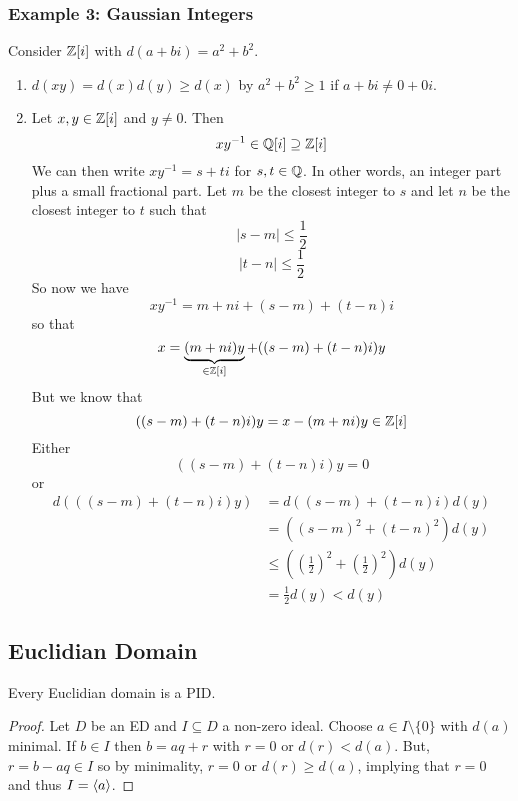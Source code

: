 \documentclass[letterpaper]{article}
\begin{document}
\subsubsection{Example 3: Gaussian Integers}
Consider $\mathbb{Z}[i]$ with $d(a + bi) = a^2 + b^2$. 
\begin{enumerate}
    \item $d(xy) = d(x)d(y) \geq d(x)$ by $a^2 + b^2 \geq 1$ if $a + bi \neq 0 + 0i$. 
    \item Let $x, y \in \mathbb{Z}[i]$ and $y \neq 0$. Then 
    \[xy^{-1} \in \mathbb{Q}[i] \supseteq \mathbb{Z}[i]\]
    We can then write $xy^{-1} = s + ti$ for $s, t \in \mathbb{Q}$. In other words, an integer part plus a small fractional part. Let $m$ be the closest integer to $s$ and let $n$ be the closest integer to $t$ such that 
    \[|s - m| \leq \frac{1}{2}\]
    \[|t - n| \leq \frac{1}{2}\]
    So now we have 
    \[xy^{-1} = m + ni + (s - m) + (t - n)i\]
    so that 
    \[x = \underbrace{(m + ni)y}_{\in \mathbb{Z}[i]} + ((s - m) + (t - n)i)y\]
    But we know that 
    \[((s - m) + (t - n)i)y = x - (m + ni)y \in \mathbb{Z}[i]\]
    Either 
    \[((s - m) + (t - n)i)y = 0\]
    or 
    \begin{equation*}
        \begin{aligned}
            d(((s - m) + (t - n)i)y) &= d((s - m) + (t - n)i) d(y) \\ 
                &= ((s - m)^2 + (t - n)^2) d(y) \\ 
                &\leq \left(\left(\frac{1}{2}\right)^2 + \left(\frac{1}{2}\right)^2\right) d(y) \\ 
                &= \frac{1}{2} d(y) < d(y)
        \end{aligned}
    \end{equation*}
\end{enumerate}

\subsection{Euclidian Domain}
\begin{theorem}{}{}
    Every Euclidian domain is a PID. 
\end{theorem}
\begin{mdframed}[]
    \begin{proof}
        Let $D$ be an ED and $I \subseteq D$ a non-zero ideal. Choose $a \in I \setminus \{0\}$ with $d(a)$ minimal. If $b \in I$ then $b = aq + r$ with $r = 0$ or $d(r) < d(a)$. But, $r = b - aq \in I$ so by minimality, $r = 0$ or $d(r) \geq d(a)$, implying that $r = 0$ and thus $I = \langle a \rangle$. 
    \end{proof}
\end{mdframed}
\end{document}

